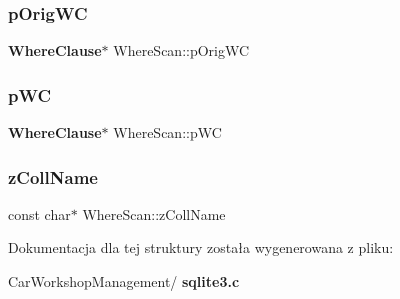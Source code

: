 \mbox{\label{struct_where_scan_a848dc138a80d4e16ce5044e3d3125831}} 
\subsubsection{pOrigWC}
{\footnotesize\ttfamily \textbf{ Where\+Clause}$\ast$ Where\+Scan\+::p\+Orig\+WC}

\mbox{\label{struct_where_scan_a255e78bbf5eb2aafe98d5f0285c1987c}} 
\subsubsection{pWC}
{\footnotesize\ttfamily \textbf{ Where\+Clause}$\ast$ Where\+Scan\+::p\+WC}

\mbox{\label{struct_where_scan_aa21062fab71aadb240a866ff0b5e1a98}} 
\subsubsection{zCollName}
{\footnotesize\ttfamily const char$\ast$ Where\+Scan\+::z\+Coll\+Name}



Dokumentacja dla tej struktury została wygenerowana z pliku\+:\begin{DoxyCompactItemize}
\item 
Car\+Workshop\+Management/\textbf{ sqlite3.\+c}\end{DoxyCompactItemize}
